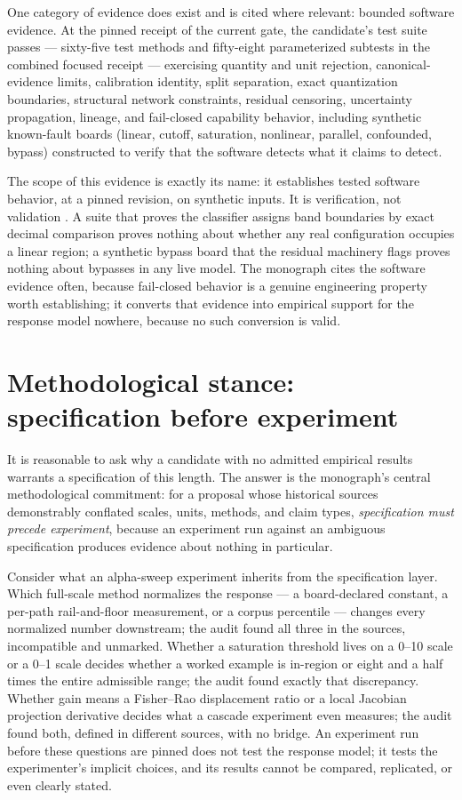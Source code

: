 One category of evidence does exist and is cited where relevant: bounded software evidence. At the pinned receipt of the current gate, the candidate's test suite passes --- sixty-five test methods and fifty-eight parameterized subtests in the combined focused receipt --- exercising quantity and unit rejection, canonical-evidence limits, calibration identity, split separation, exact quantization boundaries, structural network constraints, residual censoring, uncertainty propagation, lineage, and fail-closed capability behavior, including synthetic known-fault boards (linear, cutoff, saturation, nonlinear, parallel, confounded, bypass) constructed to verify that the software detects what it claims to detect.

The scope of this evidence is exactly its name: it establishes tested software behavior, at a pinned revision, on synthetic inputs. It is verification, not validation \cite{sargent}. A suite that proves the classifier assigns band boundaries by exact decimal comparison proves nothing about whether any real configuration occupies a linear region; a synthetic bypass board that the residual machinery flags proves nothing about bypasses in any live model. The monograph cites the software evidence often, because fail-closed behavior is a genuine engineering property worth establishing; it converts that evidence into empirical support for the response model nowhere, because no such conversion is valid.

\section{Methodological stance: specification before experiment}\label{ch01:stance}

It is reasonable to ask why a candidate with no admitted empirical results warrants a specification of this length. The answer is the monograph's central methodological commitment: for a proposal whose historical sources demonstrably conflated scales, units, methods, and claim types, \emph{specification must precede experiment}, because an experiment run against an ambiguous specification produces evidence about nothing in particular.

Consider what an alpha-sweep experiment inherits from the specification layer. Which full-scale method normalizes the response --- a board-declared constant, a per-path rail-and-floor measurement, or a corpus percentile --- changes every normalized number downstream; the audit found all three in the sources, incompatible and unmarked. Whether a saturation threshold lives on a 0--10 scale or a 0--1 scale decides whether a worked example is in-region or eight and a half times the entire admissible range; the audit found exactly that discrepancy. Whether gain means a Fisher--Rao displacement ratio or a local Jacobian projection derivative decides what a cascade experiment even measures; the audit found both, defined in different sources, with no bridge. An experiment run before these questions are pinned does not test the response model; it tests the experimenter's implicit choices, and its results cannot be compared, replicated, or even clearly stated.

